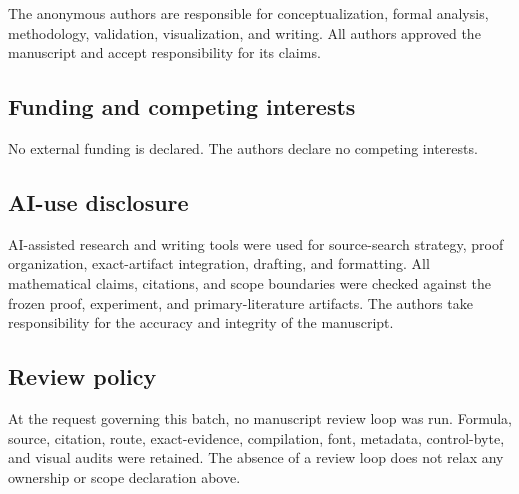 The anonymous authors are responsible for conceptualization, formal
analysis, methodology, validation, visualization, and writing.  All authors
approved the manuscript and accept responsibility for its claims.

\subsection{Funding and competing interests}

No external funding is declared.  The authors declare no competing
interests.

\subsection{AI-use disclosure}

AI-assisted research and writing tools were used for source-search strategy,
proof organization, exact-artifact integration, drafting, and formatting.
All mathematical claims, citations, and scope boundaries were checked against
the frozen proof, experiment, and primary-literature artifacts.  The authors
take responsibility for the accuracy and integrity of the manuscript.

\subsection{Review policy}

\enlargethispage{2\baselineskip}
At the request governing this batch, no manuscript review loop was run.
Formula, source, citation, route, exact-evidence, compilation, font, metadata,
control-byte, and visual audits were retained.  The absence of a review loop
does not relax any ownership or scope declaration above.
